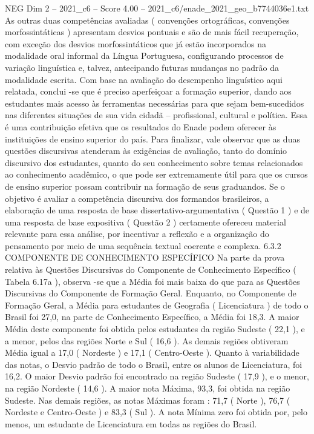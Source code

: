 \begin{textsample}{NEG Dim 2 – 2021\_c6 – Score 4.00 – 2021\_c6/enade\_2021\_geo\_b7744036e1.txt}
As outras duas competências avaliadas ( convenções ortográficas, convenções morfossintáticas ) apresentam desvios pontuais e são de mais fácil recuperação, com exceção dos desvios morfossintáticos que já estão incorporados na modalidade oral informal da Língua Portuguesa, configurando processos de variação linguística e, talvez, antecipando futuras mudanças no padrão da modalidade escrita.
Com base na avaliação do desempenho linguístico aqui relatada, conclui -se que é preciso aperfeiçoar a formação superior, dando aos estudantes mais acesso às ferramentas necessárias para que sejam bem-sucedidos nas diferentes situações de sua vida cidadã – profissional, cultural e política.
Essa é uma contribuição efetiva que os resultados do Enade podem oferecer às instituições de ensino superior do país.
Para finalizar, vale observar que as duas questões discursivas atenderam às exigências de avaliação, tanto do domínio discursivo dos estudantes, quanto do seu conhecimento sobre temas relacionados ao conhecimento acadêmico, o que pode ser extremamente útil para que os cursos de ensino superior possam contribuir na formação de seus graduandos.
Se o objetivo é avaliar a competência discursiva dos formandos brasileiros, a elaboração de uma resposta de base dissertativo-argumentativa ( Questão 1 ) e de uma resposta de base expositiva ( Questão 2 ) certamente ofereceu material relevante para essa análise, por incentivar a reflexão e a organização do pensamento por meio de uma sequência textual coerente e complexa. 6.3.2 COMPONENTE DE CONHECIMENTO ESPECÍFICO Na parte da prova relativa às Questões Discursivas do Componente de Conhecimento Específico ( Tabela 6.17a ), observa -se que a Média foi mais baixa do que para as Questões Discursivas do Componente de Formação Geral.
Enquanto, no Componente de Formação Geral, a Média para estudantes de Geografia ( Licenciatura ) de todo o Brasil foi 27,0, na parte de Conhecimento Específico, a Média foi 18,3.
A maior Média deste componente foi obtida pelos estudantes da região Sudeste ( 22,1 ), e a menor, pelos das regiões Norte e Sul ( 16,6 ).
As demais regiões obtiveram Média igual a 17,0 ( Nordeste ) e 17,1 ( Centro-Oeste ).
Quanto à variabilidade das notas, o Desvio padrão de todo o Brasil, entre os alunos de Licenciatura, foi 16,2.
O maior Desvio padrão foi encontrado na região Sudeste ( 17,9 ), e o menor, na região Nordeste ( 14,6 ).
A maior nota Máxima, 93,3, foi obtida na região Sudeste.
Nas demais regiões, as notas Máximas foram : 71,7 ( Norte ), 76,7 ( Nordeste e Centro-Oeste ) e 83,3 ( Sul ).
A nota Mínima zero foi obtida por, pelo menos, um estudante de Licenciatura em todas as regiões do Brasil.

\end{textsample}
